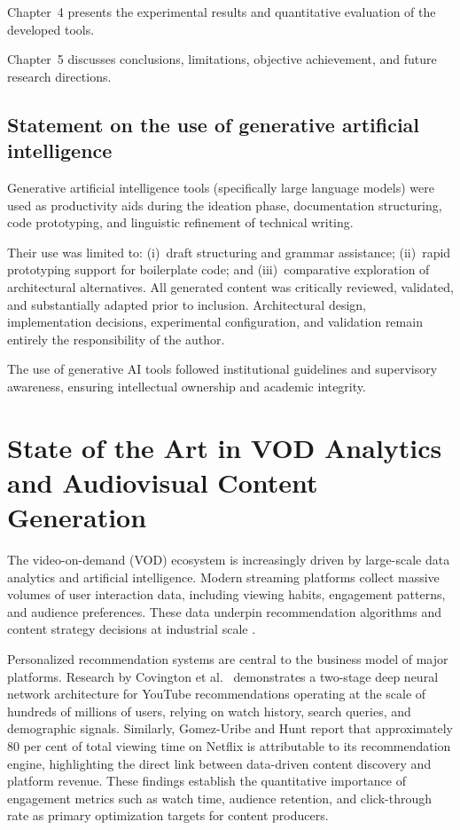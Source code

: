 \documentclass[ENG]{TFUOC}
\begin{document}
Chapter~4 presents the experimental results and quantitative evaluation of the developed tools.

Chapter~5 discusses conclusions, limitations, objective achievement, and future research directions.

\section{Statement on the use of generative artificial intelligence}

Generative artificial intelligence tools (specifically large language models) were used as productivity aids during the ideation phase, documentation structuring, code prototyping, and linguistic refinement of technical writing.

Their use was limited to: (i)~draft structuring and grammar assistance; (ii)~rapid prototyping support for boilerplate code; and (iii)~comparative exploration of architectural alternatives. All generated content was critically reviewed, validated, and substantially adapted prior to inclusion. Architectural design, implementation decisions, experimental configuration, and validation remain entirely the responsibility of the author.

The use of generative AI tools followed institutional guidelines and supervisory awareness, ensuring intellectual ownership and academic integrity.


\chapter{State of the Art in VOD Analytics and Audiovisual Content Generation}

The video-on-demand (VOD) ecosystem is increasingly driven by large-scale data analytics and artificial intelligence. Modern streaming platforms collect massive volumes of user interaction data, including viewing habits, engagement patterns, and audience preferences. These data underpin recommendation algorithms and content strategy decisions at industrial scale \cite{vod_bigdata, recommender_systems_streaming}.

Personalized recommendation systems are central to the business model of major platforms. Research by Covington et al.\ \cite{recommender_systems_streaming} demonstrates a two-stage deep neural network architecture for YouTube recommendations operating at the scale of hundreds of millions of users, relying on watch history, search queries, and demographic signals. Similarly, Gomez-Uribe and Hunt \cite{vod_bigdata} report that approximately 80 per cent of total viewing time on Netflix is attributable to its recommendation engine, highlighting the direct link between data-driven content discovery and platform revenue. These findings establish the quantitative importance of engagement metrics such as watch time, audience retention, and click-through rate as primary optimization targets for content producers.
\end{document}
